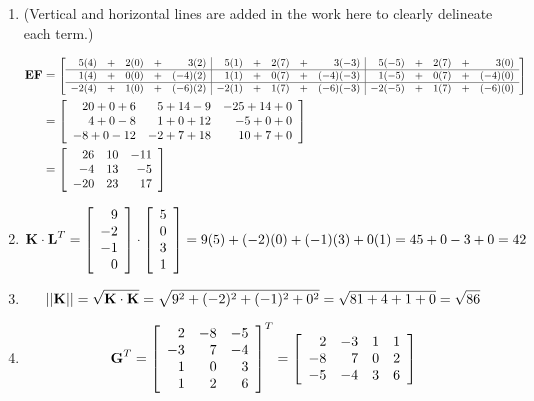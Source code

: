 \documentclass[12pt]{article}
\newcommand\scalemath[2]{\scalebox{#1}{\mbox{\ensuremath{\displaystyle #2}}}}
\begin{document}
\begin{enumerate}
\item (Vertical and horizontal lines are added in the work here to clearly delineate each term.) 
\small

 \begin{align*}
\textrm{\textbf{EF}} &= \scalemath{.85}{\left[\begin{array}{rrrrr|rrrrr|rrrrr}
5(4)&+& 2(0) &+& 3(2) & 5(1) &+& 2(7) &+& 3(-3) & 5(-5) &+& 2(7) &+& 3(0)\\ \hline
1(4)&+& 0(0) &+& (-4)(2) & 1(1) &+& 0(7) &+& (-4)(-3) & 1(-5) &+& 0(7) &+& (-4)(0)\\ \hline
-2(4) &+& 1(0) &+& (-6)(2) & -2(1) &+& 1(7) &+& (-6)(-3) & -2(-5) &+& 1(7) &+& (-6)(0)
\end{array}\right]} \\
&= \left[\begin{array}{rrr}
20 + 0 + 6 & 5 + 14 -9 & -25 + 14 + 0\\
4+0-8 & 1+0+12 & -5+0+0\\
-8+0-12 & -2 + 7 + 18 & 10+7+0\end{array}\right]\\
&= \left[\begin{array}{rrr}
26 & 10 & -11\\
-4 & 13 & -5\\
-20 & 23 & 17 \end{array}\right]
\end{align*}
\normalsize

\item $$\textrm{\textbf{K}} \cdot \textrm{\textbf{L}}^T = \left[\begin{array}{r} 9 \\ -2 \\ -1 \\ 0 \end{array}\right] \cdot \left[\begin{array}{r} 5\\0\\3\\1\end{array}\right] = 9(5) + (-2)(0) + (-1)(3) + 0(1) = 45 + 0 - 3 + 0 = 42$$

\item $$||\textrm{\textbf{K}}|| = \sqrt{\textrm{\textbf{K}} \cdot \textrm{\textbf{K}}} = \sqrt{9^2 + (-2)^2 + (-1)^2 + 0^2} = \sqrt{81 + 4 + 1 + 0} = \sqrt{86}$$

\item $$\textrm{\textbf{G}}^T = \left[\begin{array}{rrr}
2 & -8 & -5\\
-3 & 7 & -4\\
1 & 0 & 3\\
1 & 2 & 6
\end{array}\right]^T =
 \left[\begin{array}{rrrr}
2 & -3 & 1 & 1\\
-8 & 7 & 0 & 2\\
-5 & -4 & 3 & 6 \end{array}\right]$$


\end{enumerate}
\end{document}

